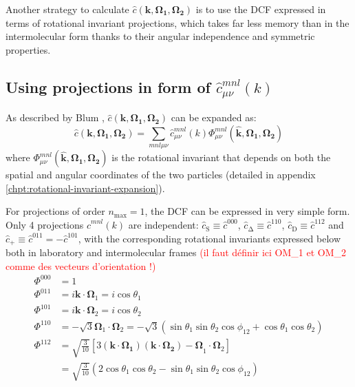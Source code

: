 Another strategy to calculate $\hat{c}(\mathbf{k},\mathbf{\Omega_{1}},\mathbf{\Omega_{2}})$
is to use the DCF expressed in terms of rotational invariant projections,
which takes far less memory than in the intermolecular form thanks
to their angular independence and symmetric properties. 


\subsection{Using projections in form of $\hat{c}_{\mu\nu}^{mnl}(k)$\label{sub:Using-projections-in}}

As described by Blum \citep{Blum_I, Blum_II}, $\hat{c}(\mathbf{k},\mathbf{\Omega_{1}},\mathbf{\Omega_{2}})$
can be expanded as:
\begin{equation}
\hat{c}(\mathbf{k},\mathbf{\Omega_{1}},\mathbf{\Omega_{2}})=\sum_{mnl\mu\nu}\hat{c}_{\mu\nu}^{mnl}(k)\Phi_{\mu\nu}^{mnl}(\mathbf{\hat{k}},\mathbf{\Omega_{1}},\mathbf{\Omega_{2}})
\end{equation}
where $\Phi_{\mu\nu}^{mnl}(\mathbf{\hat{k}},\mathbf{\Omega_{1}},\mathbf{\Omega_{2}})$
is the rotational invariant that depends on both the spatial and angular
coordinates of the two particles (detailed in appendix \ref{chpt:rotational-invariant-expansion}).

For projections of order $n{}_{\mathrm{max}}=1$, the DCF can be expressed
in very simple form. Only 4 projections $\hat{c}^{mnl}(k)$ are independent:
$\hat{c}_{\mathrm{S}}\equiv\hat{c}^{000}$, $\hat{c}_{\mathrm{\Delta}}\equiv\hat{c}^{110}$,
$\hat{c}_{\mathrm{D}}\equiv\hat{c}^{112}$ and $\hat{c}_{+}\equiv\hat{c}^{011}=-\hat{c}^{101}$,
with the corresponding rotational invariants expressed below both
in laboratory and intermolecular frames \textcolor{red}{(il faut définir
ici OM\_1 et OM\_2 comme des vecteurs d'orientation !)}
\begin{align}
\Phi^{000} & =1\nonumber \\
\Phi^{011} & =i\mathbf{k}\cdot\mathbf{\Omega}_{1}=i\cos\theta_{1}\nonumber \\
\Phi^{101} & =i\mathbf{k}\cdot\mathbf{\Omega}_{2}=i\cos\theta_{2}\nonumber \\
\Phi^{110} & =-\sqrt{3}\mathbf{\Omega}_{1}\cdot\mathbf{\Omega}_{2}=-\sqrt{3}(\sin\theta_{1}\sin\theta_{2}\cos\phi_{12}+\cos\theta_{1}\cos\theta_{2})\nonumber \\
\Phi^{112} & =\sqrt{\frac{3}{10}}\left[3\mathbf{(\mathbf{k}\cdot\mathbf{\Omega}_{1})(\mathbf{k}\cdot\mathbf{\Omega}_{2})-\Omega}_{1}\cdot\mathbf{\Omega}_{2}\right]\\
 & =\sqrt{\frac{3}{10}}\left(2\cos\theta_{1}\cos\theta_{2}-\sin\theta_{1}\sin\theta_{2}\cos\phi_{12}\right)\nonumber 
\end{align}


